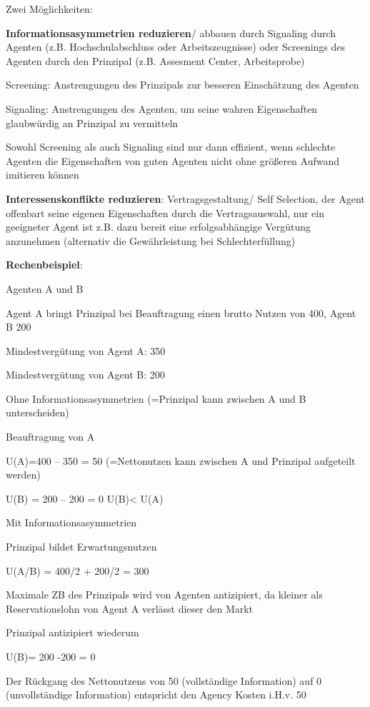 \documentclass[
]{article}
\begin{document}
Zwei Möglichkeiten:

\textbf{Informationsasymmetrien reduzieren}/ abbauen durch Signaling
durch Agenten (z.B. Hochschulabschluss oder Arbeitszeugnisse) oder
Screenings des Agenten durch den Prinzipal (z.B. Assesment Center,
Arbeitsprobe)

Screening: Anstrengungen des Prinzipals zur besseren Einschätzung des
Agenten

Signaling: Anstrengungen des Agenten, um seine wahren Eigenschaften
glaubwürdig an Prinzipal zu vermitteln

Sowohl Screening als auch Signaling sind nur dann effizient, wenn
schlechte Agenten die Eigenschaften von guten Agenten nicht ohne
größeren Aufwand imitieren können

\textbf{Interessenskonflikte reduzieren}: Vertragsgestaltung/ Self
Selection, der Agent offenbart seine eigenen Eigenschaften durch die
Vertragsauswahl, nur ein geeigneter Agent ist z.B. dazu bereit eine
erfolgsabhängige Vergütung anzunehmen (alternativ die Gewährleistung bei
Schlechterfüllung)

\textbf{Rechenbeispiel}:

Agenten A und B

Agent A bringt Prinzipal bei Beauftragung einen brutto Nutzen von 400,
Agent B 200

Mindestvergütung von Agent A: 350

Mindestvergütung von Agent B: 200

Ohne Informationsasymmetrien (=Prinzipal kann zwischen A und B
unterscheiden)

Beauftragung von A

U(A)=400 -- 350 = 50 (=Nettonutzen kann zwischen A und Prinzipal
aufgeteilt werden)

U(B) = 200 -- 200 = 0 U(B)\textless{} U(A)

Mit Informationsasymmetrien

Prinzipal bildet Erwartungsnutzen

U(A/B) = 400/2 + 200/2 = 300

Maximale ZB des Prinzipals wird von Agenten antizipiert, da kleiner als
Reservationslohn von Agent A verlässt dieser den Markt

Prinzipal antizipiert wiederum

U(B)= 200 -200 = 0

Der Rückgang des Nettonutzens von 50 (vollständige Information) auf 0
(unvollständige Information) entspricht den Agency Kosten i.H.v. 50
\end{document}
